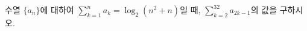 수열 $\{a_n\}$에 대하여 $\displaystyle\sum_{k=1}^{n}a_k=\log_2(n^2+n)$일 때, $\displaystyle\sum_{k=2}^{32}a_{2k-1}$의 값을 구하시오.
